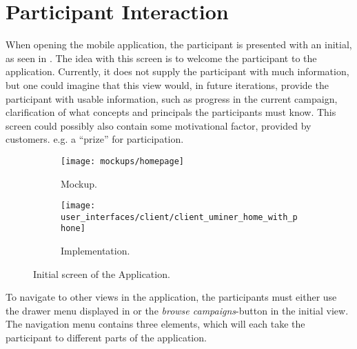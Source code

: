 
\section{Participant Interaction}
When opening the mobile application, the participant is presented with an initial, as seen in . The idea with this screen is to welcome the participant to the application. Currently, it does not supply the participant with much information, but one could imagine that this view would, in future iterations, provide the participant with usable information, such as progress in the current campaign, clarification of what concepts and principals the participants must know. This screen could possibly also contain some motivational factor, provided by customers. e.g. a ``prize'' for participation.


\begin{figure}[!htbp]
\begin{subfigure}[!t]{.48\textwidth}
  \centering
  \texttt{[image: mockups/homepage]}
  \caption{Mockup.}
  \label{fig:mockup_initial_screen}
\end{subfigure}%
\begin{subfigure}[!t]{.52\textwidth}
  \centering
  \texttt{[image: user\_interfaces/client/client\_uminer\_home\_with\_phone]}
  \caption{Implementation.}
  \label{fig:implementation_initial_screen}
\end{subfigure}
\caption{Initial screen of the Application.}
\label{fig:initial_screen}
\end{figure}
\FloatBarrier

To navigate to other views in the application, the participants must either use the drawer menu displayed in  or the \emph{browse campaigns}-button in the initial view. The navigation menu contains three elements, which will each take the participant to different parts of the application.

